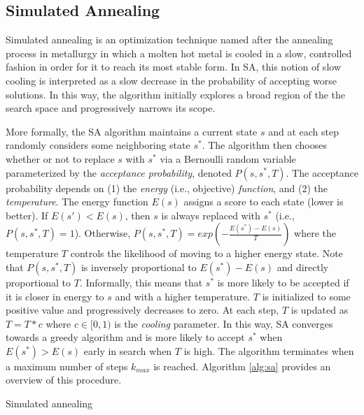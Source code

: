 \subsection{Simulated Annealing}\label{sec:sa}

Simulated annealing is an optimization technique named after the annealing process in metallurgy in which a molten hot metal is cooled in a slow, controlled fashion in order for it to reach its most stable form.
In SA, this notion of slow cooling is interpreted as a slow decrease in the probability of accepting worse solutions.
In this way, the algorithm initially explores a broad region of the the search space and progressively narrows its scope.

More formally, the SA algorithm maintains a current state $s$ and at each step randomly considers some neighboring state $s^*$.
The algorithm then chooses whether or not to replace $s$ with $s^*$ via a Bernoulli random variable parameterized by the \emph{acceptance probability}, denoted $P(s, s^*, T)$. %
The acceptance probability depends on (1) the \emph{energy} (i.e., objective) \emph{function}, and (2) the \emph{temperature}.
The energy function $E(s)$ assigns a score to each state (lower is better).
If $E(s') < E(s)$, then $s$ is always replaced with $s^*$ (i.e., $P(s, s^*, T) = 1$).
Otherwise, $P(s, s^*, T) = exp(-\frac{E(s^*) - E(s)}{T})$ where the temperature $T$ controls the likelihood of moving to a higher energy state.
Note that $P(s, s^*, T)$ is inversely proportional to $E(s^*) - E(s)$ and directly proportional to $T$.
Informally, this means that $s^*$ is more likely to be accepted if it is closer in energy to $s$ and with a higher temperature.
$T$ is initialized to some positive value and progressively decreases to zero.
At each step, $T$ is updated as $T = T * c$ where $c \in [0, 1)$ is the \emph{cooling} parameter. %
In this way, SA converges towards a greedy algorithm and is more likely to accept $s^*$ when $E(s^*) > E(s)$ early in search when $T$ is high.
The algorithm terminates when a maximum number of steps $k_{max}$ is reached.
Algorithm \ref{alg:sa} provides an overview of this procedure.

\begin{algorithm}[t]
  \caption{Simulated annealing
    \label{alg:sa}}
  \begin{algorithmic}[1]
        \EndIf
      \EndFor
      \State {}
    \EndFunction
  \end{algorithmic}
\end{algorithm}

